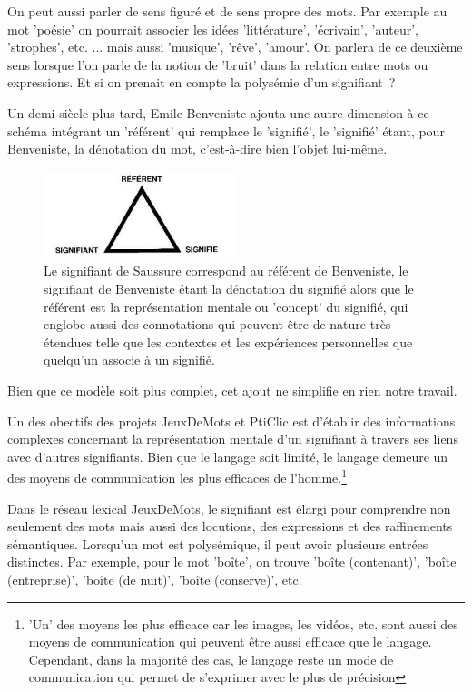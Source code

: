 \documentclass[a4paper,11pt,french]{article}
\begin{document}
On peut aussi parler de sens figuré et de sens propre des mots. Par exemple au mot 'poésie' on pourrait associer les idées 'littérature', 'écrivain', 'auteur', 'strophes', etc. ... mais aussi 'musique', 'rêve', 'amour'. On parlera de ce deuxième sens lorsque l'on parle de la notion de 'bruit' dans la relation entre mots ou expressions. Et si on prenait en compte la polysémie d'un signifiant~?

Un demi-siècle plus tard, Emile Benveniste ajouta une autre dimension à ce schéma intégrant un 'référent' qui remplace le 'signifié', le 'signifié' étant, pour Benveniste, la dénotation du mot, c'est-à-dire bien l'objet lui-même. 

\begin{figure}[h!]
  \centering
      \includegraphics[width=0.5\textwidth]{img/trianglesemiotique.jpeg}
  \caption{Le signifiant de Saussure correspond au référent de Benveniste, le signifiant de Benveniste étant la dénotation du signifié alors que le référent est la représentation mentale ou 'concept' du signifié, qui englobe aussi des connotations qui peuvent être de nature très étendues telle que les contextes et les expériences personnelles que quelqu'un associe à un signifié.}
\end{figure}

Bien que ce modèle soit plus complet, cet ajout ne simplifie en rien notre travail. 

Un des obectifs des projets JeuxDeMots et PtiClic est d'établir des informations complexes concernant la représentation mentale d'un signifiant à travers ses liens avec d'autres signifiants. Bien que le langage soit limité, le langage demeure un des moyens de communication les plus efficaces de l'homme.\footnote{'Un' des moyens les plus efficace car les images, les vidéos, etc. sont aussi des moyens de communication qui peuvent être aussi efficace que le langage. Cependant, dans la majorité des cas, le langage reste un mode de communication qui permet de s'exprimer avec le plus de précision} 

Dans le réseau lexical JeuxDeMots, le signifiant est élargi pour comprendre non seulement des mots mais aussi des locutions, des expressions et des raffinements sémantiques. Lorsqu'un mot est polysémique, il peut avoir plusieurs entrées distinctes. Par exemple, pour le mot 'boîte', on trouve 'boîte (contenant)', 'boîte (entreprise)', 'boîte (de nuit)', 'boîte (conserve)', etc.
\end{document}
